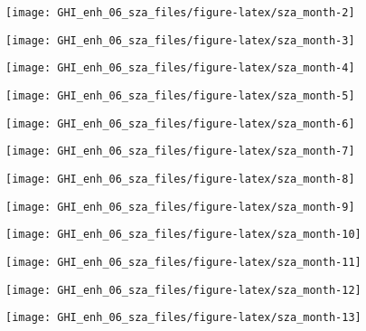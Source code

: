 \documentclass[
  10pt,
  a4paper,oneside]{article}
\begin{document}
\begin{center}\texttt{[image: GHI\_enh\_06\_sza\_files/figure-latex/sza\_month-2]} \end{center}

\begin{center}\texttt{[image: GHI\_enh\_06\_sza\_files/figure-latex/sza\_month-3]} \end{center}

\begin{center}\texttt{[image: GHI\_enh\_06\_sza\_files/figure-latex/sza\_month-4]} \end{center}

\begin{center}\texttt{[image: GHI\_enh\_06\_sza\_files/figure-latex/sza\_month-5]} \end{center}

\begin{center}\texttt{[image: GHI\_enh\_06\_sza\_files/figure-latex/sza\_month-6]} \end{center}

\begin{center}\texttt{[image: GHI\_enh\_06\_sza\_files/figure-latex/sza\_month-7]} \end{center}

\begin{center}\texttt{[image: GHI\_enh\_06\_sza\_files/figure-latex/sza\_month-8]} \end{center}

\begin{center}\texttt{[image: GHI\_enh\_06\_sza\_files/figure-latex/sza\_month-9]} \end{center}

\begin{center}\texttt{[image: GHI\_enh\_06\_sza\_files/figure-latex/sza\_month-10]} \end{center}

\begin{center}\texttt{[image: GHI\_enh\_06\_sza\_files/figure-latex/sza\_month-11]} \end{center}

\begin{center}\texttt{[image: GHI\_enh\_06\_sza\_files/figure-latex/sza\_month-12]} \end{center}

\begin{center}\texttt{[image: GHI\_enh\_06\_sza\_files/figure-latex/sza\_month-13]} \end{center}
\end{document}

